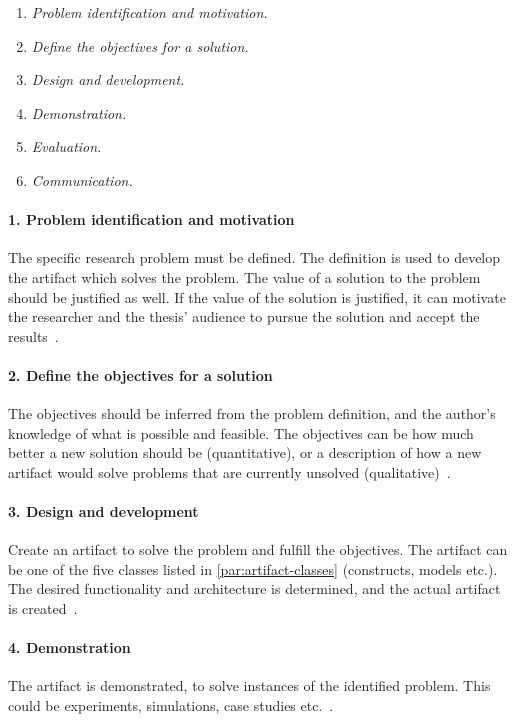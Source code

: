 \begin{enumerate}
  \item \textit{Problem identification and motivation.}
  \item \textit{Define the objectives for a solution.}
  \item \textit{Design and development.}
  \item \textit{Demonstration.}
  \item \textit{Evaluation.}
  \item \textit{Communication.}
\end{enumerate}


\paragraph{1. Problem identification and motivation}
The specific research problem must be defined.
The definition is used to develop the artifact which solves the problem.
The value of a solution to the problem should be justified as well.
If the value of the solution is justified, it can motivate the researcher and the thesis' audience to pursue the solution and accept the results~\cite[p.~28,29]{alanhevnerDesignResearchInformation2010}.

\paragraph{2. Define the objectives for a solution}
The objectives should be inferred from the problem definition, and the author's knowledge of what is possible and feasible.
The objectives can be how much better a new solution should be (quantitative), or a description of how a new artifact would solve problems that are currently unsolved (qualitative)~\cite[p.~29]{alanhevnerDesignResearchInformation2010}.

\paragraph{3. Design and development}
Create an artifact to solve the problem and fulfill the objectives.
The artifact can be one of the five classes listed in \cref{par:artifact-classes} (constructs, models etc.).
The desired functionality and architecture is determined, and the actual artifact is created~\cite[p.~29]{alanhevnerDesignResearchInformation2010}.


\paragraph{4. Demonstration}
The artifact is demonstrated, to solve instances of the identified problem.
This could be experiments, simulations, case studies etc.~\cite[p.~30]{alanhevnerDesignResearchInformation2010}.



